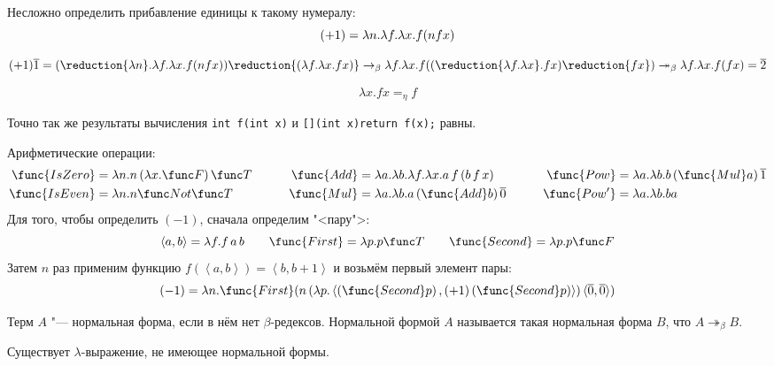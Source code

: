 Несложно определить прибавление единицы к такому нумералу:
\[
    (+1) = \lambda{}n.\lambda{}f.\lambda{}x.f(nfx) \\
\]
\begin{example}
    \[
        (+1) \overline{1} =
        (\reduction{\lambda n} . \lambda f . \lambda x . f (n f x)) \reduction{(\lambda f . \lambda x . f x)} \to_{\beta}
        \lambda f . \lambda x . f ((\reduction{\lambda f . \lambda x} . f x) \reduction{f x}) \twoheadrightarrow_{\beta}
        \lambda f . \lambda x . f (f x) =
        \overline{2}
    \]
\end{example}

\begin{definition}
    \[
        \lambda x . f x =_{\eta} f
    \]
\end{definition}
Точно так же результаты вычисления \texttt{int f(int x)} и \texttt{[](int x){return f(x);}} равны.

Арифметические операции:
\begin{align*}
    \func{IsZero} &= \lambda{}n.n\mathinner{(\lambda{}x.\F)}\T &\qquad
    \func{Add}    &= \lambda{}a.\lambda{}b.\lambda{}f.\lambda{}x.a \mathinner{f} (b \mathinner{f} x) &\qquad
    \func{Pow}    &= \lambda{}a.\lambda{}b.b \mathinner{(\func{Mul} a)} \mathinner{\overline{1}} \\
    \func{IsEven} &= \lambda{}n.n \Not \T &\qquad
    \func{Mul}    &= \lambda{}a.\lambda{}b.a \mathinner{(\func{Add} b)} \mathinner{\overline{0}} &\qquad
    \func{Pow'}   &= \lambda{}a.\lambda{}b.b a
\end{align*}
Для того, чтобы определить $(-1)$, сначала определим "<пару">:
\[
    \left<a,b\right> = \lambda f.f \mathinner{a} b \qquad
    \func{First} = \lambda p . p \T \qquad
    \func{Second} = \lambda p . p \F
\]%
Затем $n$ раз применим функцию $f\left(\left<a,b\right>\right) = \left<b,b+1\right>$ и возьмём первый элемент пары:
\[
    (-1) = \lambda n . \func{First}
        (n \mathinner{(\lambda p . \left<\left(\func{Second} p\right), \mathinner{(+1)} (\func{Second} p)\right>)}
        \langle\overline{0},\overline{0}\rangle)
\]

\begin{definition}
    Терм $A$ "--- нормальная форма, если в нём нет $\beta$-редексов.
    Нормальной формой $A$ называется такая нормальная форма $B$, что $A \twoheadrightarrow_{\beta} B$.
\end{definition}

\begin{statement}
    Существует $\lambda$-выражение, не имеющее нормальной формы.
\end{statement}

